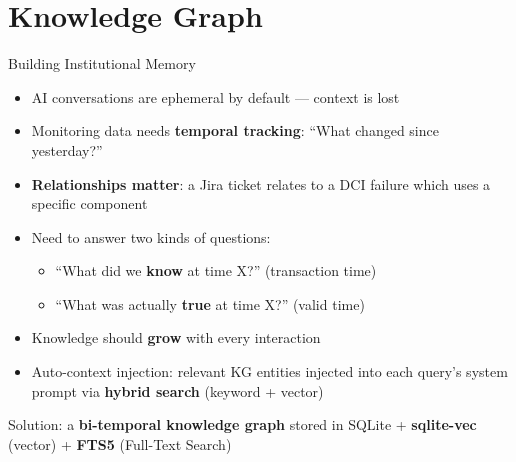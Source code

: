 \documentclass[aspectratio=169,10pt]{beamer}
\begin{document}
\section{Knowledge Graph}

\begin{frame}{Building Institutional Memory}
\begin{itemize}
  \item AI conversations are \alert{ephemeral by default} --- context is lost
  \item Monitoring data needs \textbf{temporal tracking}: ``What changed since yesterday?''
  \item \textbf{Relationships matter}: a Jira ticket relates to a DCI failure which uses a specific component
  \item Need to answer two kinds of questions:
  \begin{itemize}
    \item ``What did we \textbf{know} at time X?'' \quad (transaction time)
    \item ``What was actually \textbf{true} at time X?'' \quad (valid time)
  \end{itemize}
  \item Knowledge should \textbf{grow} with every interaction
  \item \alert{Auto-context injection}: relevant KG entities injected into each query's system prompt via \textbf{hybrid search} (keyword + vector)
\end{itemize}

\vfill
\centering
\small\color{gray} Solution: a \textbf{bi-temporal knowledge graph} stored in SQLite + \textbf{sqlite-vec} (vector) + \textbf{FTS5} (Full-Text Search)
\end{frame}
\end{document}
